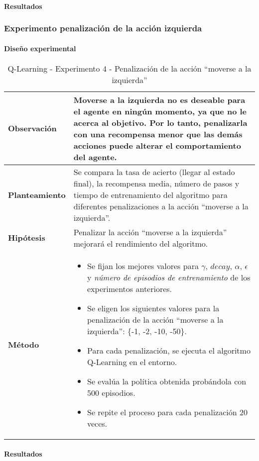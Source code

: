 \paragraph{Resultados}

\subsubsection{Experimento penalización de la acción izquierda}

\paragraph{Diseño experimental}

\begin{table}[H]
    \centering
    \begin{tabularx}{\textwidth}{|p{4cm}|X|} %
        \hline %
        \textbf{Observación} & Moverse a la izquierda no es deseable para el agente en ningún momento, ya que no le acerca al objetivo. Por lo tanto, penalizarla con una recompensa menor que las demás acciones puede alterar el comportamiento del agente.
        \\ \hline 
        \textbf{Planteamiento} & Se compara la tasa de acierto (llegar al estado final), la recompensa media, número de pasos y tiempo de entrenamiento del algoritmo para diferentes penalizaciones a la acción ``moverse a la izquierda''.
        \\ \hline
        \textbf{Hipótesis} & Penalizar la acción ``moverse a la izquierda'' mejorará el rendimiento del algoritmo.
        \\ \hline
        \textbf{Método} &
        \begin{itemize}
            \item Se fijan los mejores valores para \(\gamma\), $decay$, \(\alpha\), \(\epsilon\) y \textit{número de episodios de entrenamiento} de los experimentos anteriores.
            \item Se eligen los siguientes valores para la penalización de la acción ``moverse a la izquierda'': \{-1, -2, -10, -50\}.
            \item Para cada penalización, se ejecuta el algoritmo Q-Learning en el entorno.
            \item Se evalúa la política obtenida probándola con 500 episodios.
            \item Se repite el proceso para cada penalización 20 veces.
        \end{itemize}
        \\ \hline
    \end{tabularx}
    \caption{Q-Learning - Experimento 4 - Penalización de la acción ``moverse a la izquierda''}
    \label{tab:diseñoQLEarningExp4}
\end{table}

\paragraph{Resultados}